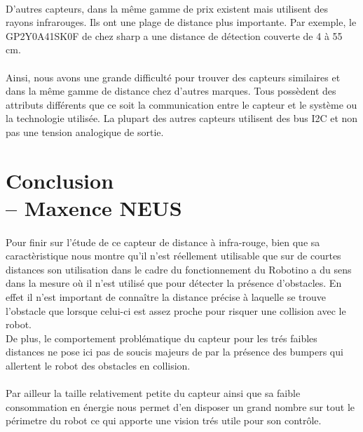 \documentclass[oneside,a4paper,12pt]{article}
\begin{document}
	\paragraph{}
	D’autres capteurs, dans la même gamme de prix existent mais utilisent des rayons infrarouges. Ils ont une plage de distance plus importante. Par exemple, le GP2Y0A41SK0F de chez sharp a une distance de détection couverte de 4 à 55 cm. 
	\paragraph{}
	Ainsi, nous avons une grande difficulté pour trouver des capteurs similaires et dans la même gamme de distance chez d’autres marques. Tous possèdent des attributs différents que ce soit la communication entre le capteur et le système ou la technologie utilisée. La plupart des autres capteurs utilisent des bus I2C et non pas une tension analogique de sortie.
	
	\newpage
	\section{Conclusion\\ -- Maxence NEUS}
	\paragraph{}
	Pour finir sur l'étude de ce capteur de distance à infra-rouge, bien que sa caractèristique nous montre qu'il n'est réellement utilisable que sur de courtes distances son utilisation dans le cadre du fonctionnement du Robotino a du sens dans la mesure o\`{u} il n'est utilisé que pour détecter la présence d'obstacles. En effet il n'est important de connaître la distance précise à laquelle se trouve l'obstacle que lorsque celui-ci est assez proche pour risquer une collision avec le robot.\\
	De plus, le comportement problématique du capteur pour les trés faibles distances ne pose ici pas de soucis majeurs de par la présence des bumpers qui allertent le robot des obstacles en collision.
	\paragraph{}
	Par ailleur la taille relativement petite du capteur ainsi que sa faible consommation en énergie nous permet d'en disposer un grand nombre sur tout le périmetre du robot ce qui apporte une vision trés utile pour son contrôle.\\
	
\end{document}
